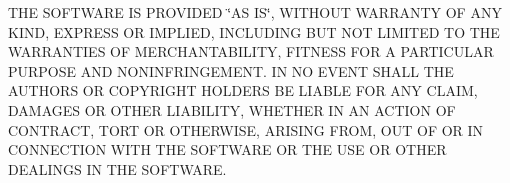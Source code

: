 T\+H\+E S\+O\+F\+T\+W\+A\+R\+E I\+S P\+R\+O\+V\+I\+D\+E\+D \char`\"{}\+A\+S I\+S\char`\"{}, W\+I\+T\+H\+O\+U\+T W\+A\+R\+R\+A\+N\+T\+Y O\+F A\+N\+Y K\+I\+N\+D, E\+X\+P\+R\+E\+S\+S O\+R I\+M\+P\+L\+I\+E\+D, I\+N\+C\+L\+U\+D\+I\+N\+G B\+U\+T N\+O\+T L\+I\+M\+I\+T\+E\+D T\+O T\+H\+E W\+A\+R\+R\+A\+N\+T\+I\+E\+S O\+F M\+E\+R\+C\+H\+A\+N\+T\+A\+B\+I\+L\+I\+T\+Y, F\+I\+T\+N\+E\+S\+S F\+O\+R A P\+A\+R\+T\+I\+C\+U\+L\+A\+R P\+U\+R\+P\+O\+S\+E A\+N\+D N\+O\+N\+I\+N\+F\+R\+I\+N\+G\+E\+M\+E\+N\+T. I\+N N\+O E\+V\+E\+N\+T S\+H\+A\+L\+L T\+H\+E A\+U\+T\+H\+O\+R\+S O\+R C\+O\+P\+Y\+R\+I\+G\+H\+T H\+O\+L\+D\+E\+R\+S B\+E L\+I\+A\+B\+L\+E F\+O\+R A\+N\+Y C\+L\+A\+I\+M, D\+A\+M\+A\+G\+E\+S O\+R O\+T\+H\+E\+R L\+I\+A\+B\+I\+L\+I\+T\+Y, W\+H\+E\+T\+H\+E\+R I\+N A\+N A\+C\+T\+I\+O\+N O\+F C\+O\+N\+T\+R\+A\+C\+T, T\+O\+R\+T O\+R O\+T\+H\+E\+R\+W\+I\+S\+E, A\+R\+I\+S\+I\+N\+G F\+R\+O\+M, O\+U\+T O\+F O\+R I\+N C\+O\+N\+N\+E\+C\+T\+I\+O\+N W\+I\+T\+H T\+H\+E S\+O\+F\+T\+W\+A\+R\+E O\+R T\+H\+E U\+S\+E O\+R O\+T\+H\+E\+R D\+E\+A\+L\+I\+N\+G\+S I\+N T\+H\+E S\+O\+F\+T\+W\+A\+R\+E. 